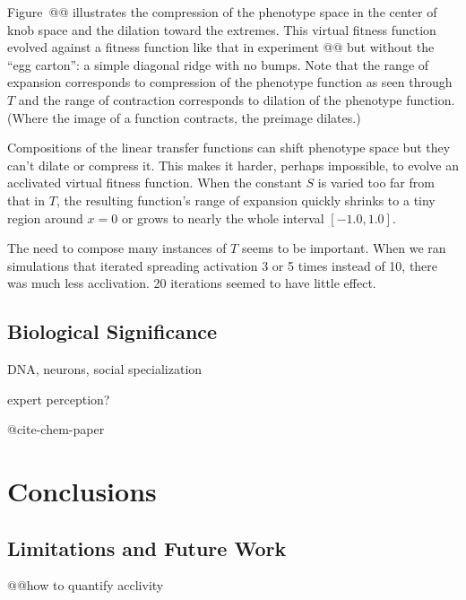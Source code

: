 \documentclass[letterpaper]{article}
\begin{document}
Figure~@@ illustrates the compression of the phenotype space in the center of
knob space and the dilation toward the extremes. This virtual fitness function
evolved against a fitness function like that in experiment @@ but without the
``egg carton'': a simple diagonal ridge with no bumps. Note that the range of
expansion corresponds to compression of the phenotype function as seen through
$T$ and the range of contraction corresponds to dilation of the phenotype
function. (Where the image of a function contracts, the preimage dilates.)

Compositions of the linear transfer functions can shift phenotype space but they
can't dilate or compress it. This makes it harder, perhaps impossible, to
evolve an acclivated virtual fitness function. When the constant $S$ is varied
too far from that in $T$, the resulting function's range of expansion quickly
shrinks to a tiny region around $x=0$ or grows to nearly the whole interval
$[-1.0, 1.0]$.

The need to compose many instances of $T$ seems to be important. When we ran
simulations that iterated spreading activation 3 or 5 times instead of 10,
there was much less acclivation. 20 iterations seemed to have little effect.

\subsection{Biological Significance}

DNA, neurons, social specialization

expert perception?

@cite-chem-paper

\section{Conclusions}

\subsection{Limitations and Future Work}

@@how to quantify acclivity



\end{document}
